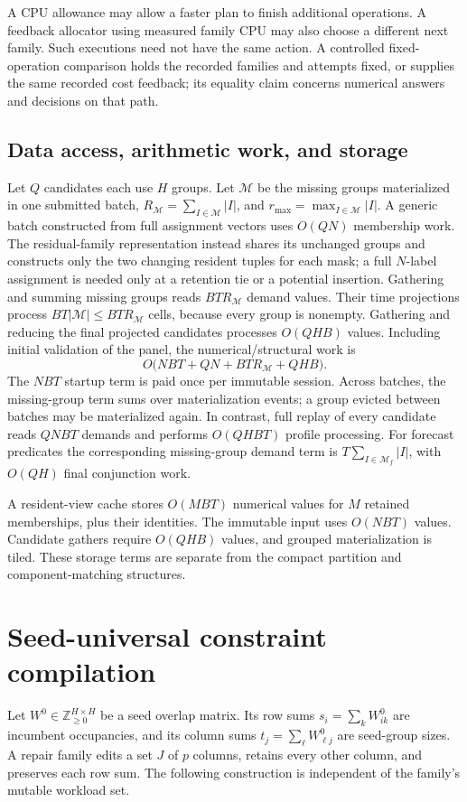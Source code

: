 \documentclass[11pt]{article}
\begin{document}
A CPU allowance may allow a faster plan to finish additional operations. A feedback allocator using measured family CPU may also choose a different next family. Such executions need not have the same action. A controlled fixed-operation comparison holds the recorded families and attempts fixed, or supplies the same recorded cost feedback; its equality claim concerns numerical answers and decisions on that path.

\subsection{Data access, arithmetic work, and storage}
Let $Q$ candidates each use $H$ groups. Let $\mathcal M$ be the missing groups materialized in one submitted batch, $R_{\mathcal M}=\sum_{I\in\mathcal M}|I|$, and $r_{\max}=\max_{I\in\mathcal M}|I|$. A generic batch constructed from full assignment vectors uses $O(QN)$ membership work. The residual-family representation instead shares its unchanged groups and constructs only the two changing resident tuples for each mask; a full $N$-label assignment is needed only at a retention tie or a potential insertion. Gathering and summing missing groups reads $BTR_{\mathcal M}$ demand values. Their time projections process $BT|\mathcal M|\le BTR_{\mathcal M}$ cells, because every group is nonempty. Gathering and reducing the final projected candidates processes $O(QHB)$ values. Including initial validation of the panel, the numerical/structural work is
\begin{equation}
 O\bigl(NBT+QN+BTR_{\mathcal M}+QHB\bigr).
\end{equation}
The $NBT$ startup term is paid once per immutable session. Across batches, the missing-group term sums over materialization events; a group evicted between batches may be materialized again. In contrast, full replay of every candidate reads $QNBT$ demands and performs $O(QHBT)$ profile processing. For forecast predicates the corresponding missing-group demand term is $T\sum_{I\in\mathcal M_f}|I|$, with $O(QH)$ final conjunction work.

A resident-view cache stores $O(MBT)$ numerical values for $M$ retained memberships, plus their identities. The immutable input uses $O(NBT)$ values. Candidate gathers require $O(QHB)$ values, and grouped materialization is tiled. These storage terms are separate from the compact partition and component-matching structures.

\section{Seed-universal constraint compilation}\label{sec:seed-universal}
Let $W^0\in\mathbb Z_{\ge0}^{H\times H}$ be a seed overlap matrix. Its row sums $s_i=\sum_kW^0_{ik}$ are incumbent occupancies, and its column sums $t_j=\sum_\ell W^0_{\ell j}$ are seed-group sizes. A repair family edits a set $J$ of $p$ columns, retains every other column, and preserves each row sum. The following construction is independent of the family's mutable workload set.
\end{document}
